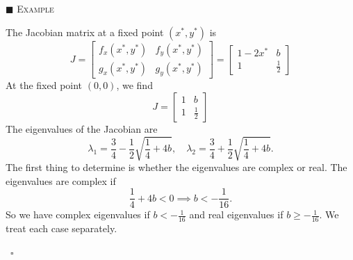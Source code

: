\documentclass[reqno]{immbook}
\numberwithin{equation}{chapter}
\numberwithin{question}{section}
\numberwithin{theorem}{chapter}
\numberwithin{figure}{chapter}
\theoremstyle{definition}
\newenvironment{xexample}%
{%

\medskip\noindent\addtocounter{example}{1}$\blacksquare$ \textsc{Example \theexample}\hspace*{1em}%
}%
{%
~\hfill$\square$

\medskip
}
\begin{document}
\begin{xexample}
The Jacobian matrix 
at a fixed point $(x^*,y^*)$ is
\begin{equation}
   J = \begin{bmatrix}
          f_x(x^*,y^*) & f_y(x^*,y^*) \\
	  g_x(x^*,y^*) & g_y(x^*,y^*) 
       \end{bmatrix}
     = \begin{bmatrix}
          1-2x^* & b \\
	   1    & \frac{1}{2}
       \end{bmatrix}
\end{equation}
At the fixed point $(0,0)$, we find
\begin{equation}
  J = \begin{bmatrix}
          1 & b \\
	  1 & \frac{1}{2}
      \end{bmatrix}
\end{equation}
The eigenvalues of the Jacobian are
\begin{equation}
  \lambda_1 = \frac{3}{4} - \frac{1}{2} \sqrt{\frac{1}{4}+4b}, \quad
  \lambda_2 = \frac{3}{4} + \frac{1}{2} \sqrt{\frac{1}{4}+4b}.
\label{eqn:exeigvals}
\end{equation}
The first thing to determine is whether the eigenvalues are
complex or real.  The eigenvalues are complex if
\begin{equation}
  \frac{1}{4} + 4b < 0 \implies b < -\frac{1}{16}.
\end{equation}
So we have complex eigenvalues if $b < -\frac{1}{16}$ and real
eigenvalues if $b \ge -\frac{1}{16}$.
We treat each case separately.


\end{xexample}
\end{document}
